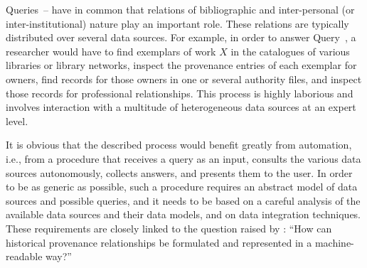%
%

Queries~--
have in common that relations of bibliographic and inter-personal (or inter-institutional)
nature play an important role.
These relations are typically distributed over several data sources.
For example, in order to answer Query~,
a researcher would have to find exemplars of work $X$
in the catalogues of various libraries or library networks,
inspect the provenance entries of each exemplar for owners,
find records for those owners in one or several authority files,
and inspect those records for professional relationships.
This process is highly laborious
and involves interaction with a multitude of heterogeneous data sources
at an expert level.

It is obvious that the described process would benefit greatly 
from automation, i.e., from a procedure that receives a query as an input,
consults the various data sources autonomously, collects answers, and presents them
to the user. In order to be as generic as possible,
such a procedure requires an abstract model of data sources and possible queries,
and it needs to be based on a careful analysis of the available data sources and their data models,
and on data integration techniques. These requirements are closely linked
to the question raised by \textcite[p.\,46, translated from German]{Hakelberg2016}:
\enquote{How can historical provenance relationships be formulated and represented
in a machine-readable way?}

%


%

